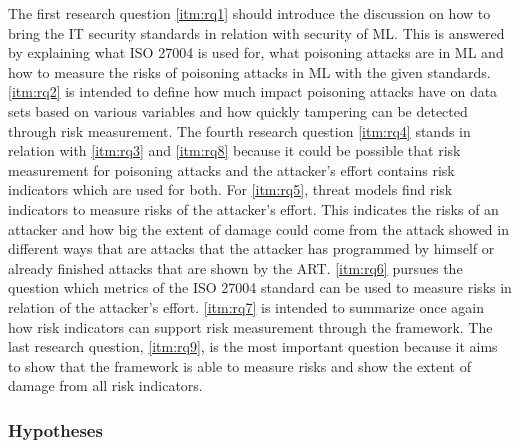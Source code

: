The first research question \ref{itm:rq1} should introduce the discussion on how to bring the IT security standards in relation with security of ML. This is answered by explaining what ISO
27004 is used for, what poisoning attacks are in ML and how to measure the risks of poisoning attacks in ML with the given standards. \ref{itm:rq2} is intended to define how much
impact poisoning attacks have on data sets based on various variables and how quickly tampering can be detected through risk measurement. The fourth research question \ref{itm:rq4} stands in relation with \ref{itm:rq3} and \ref{itm:rq8} because it could be possible that risk measurement for poisoning attacks and the attacker's effort contains risk indicators which are used for both. For \ref{itm:rq5}, threat models find risk indicators to measure risks of the attacker's effort. This indicates the risks of an attacker and how big the extent of damage could come from the attack showed in different ways that are attacks that the attacker has programmed by himself or already finished attacks that are shown by the ART. \ref{itm:rq6} pursues the question which metrics of the ISO 27004 standard can be used to measure risks in relation of the attacker's effort. \ref{itm:rq7} is intended to summarize once again how risk indicators can support risk measurement through the framework. The last research question, \ref{itm:rq9}, is the most important question because it aims to show that the framework is able to measure risks and show the extent of damage from all risk indicators.

\subsubsection*{Hypotheses}


